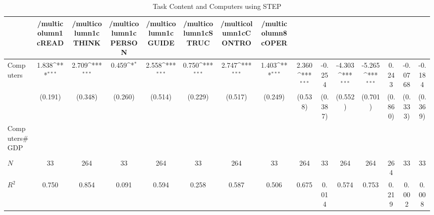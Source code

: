 \begin{table}[htbp]\centering
\def\sym#1{\ifmmode^{#1}\else\(^{#1}\)\fi}
\caption{Task Content and Computers using STEP}
\begin{tabular}{l*{14}{c}}
\hline\hline
            &/multicolumn{1}{c}{READ}&/multicolumn{1}{c}{THINK}&/multicolumn{1}{c}{PERSON}&/multicolumn{1}{c}{GUIDE}&/multicolumn{1}{c}{STRUC}&/multicolumn{1}{c}{CONTRO}&/multicolumn{8}{c}{OPER}                                                                                                                                                       \\
\hline
Computers   &       1.838\sym{***}&       2.709\sym{***}&       0.459\sym{*}  &       2.558\sym{***}&       0.750\sym{***}&       2.747\sym{***}&       1.403\sym{***}&       2.360\sym{***}&      -0.254         &      -4.303\sym{***}&      -5.265\sym{***}&       0.243         &     -0.0768         &      -0.184         \\
            &     (0.191)         &     (0.348)         &     (0.260)         &     (0.514)         &     (0.229)         &     (0.517)         &     (0.249)         &     (0.538)         &     (0.387)         &     (0.552)         &     (0.701)         &     (0.860)         &     (0.333)         &     (0.369)         \\
[1em]
Computers#GDP&                     &                     &                     &                     &                     &                     &                     &                     &                     &                     &                     &                     &                     &                     \\
            &                     &                     &                     &                     &                     &                     &                     &                     &                     &                     &                     &                     &                     &                     \\
\hline
\(N\)       &          33         &         264         &          33         &         264         &          33         &         264         &          33         &         264         &          33         &         264         &         264         &         264         &          33         &          33         \\
\(R^{2}\)   &       0.750         &       0.854         &       0.091         &       0.594         &       0.258         &       0.587         &       0.506         &       0.675         &       0.014         &       0.574         &       0.753         &       0.219         &       0.002         &       0.008         \\
\hline\hline
\end{tabular}
\end{table}
